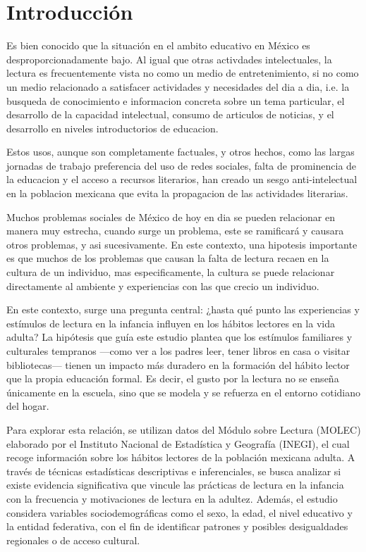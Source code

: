 \documentclass[aps,reprint]{revtex4-2}
\begin{document}
\tableofcontents

\section{Introducción}

Es bien conocido que la situación en el ambito educativo en México es desproporcionadamente bajo. Al igual que otras activdades intelectuales, la lectura es frecuentemente vista no como un medio de entretenimiento, si no como un medio relacionado a satisfacer actividades y necesidades del dia a dia, i.e. la busqueda de conocimiento e informacion concreta sobre un tema particular, el desarrollo de la capacidad intelectual, consumo de articulos de noticias, y el desarrollo en niveles introductorios de educacion. 
	
	Estos usos, aunque son completamente factuales, y otros hechos, como las largas jornadas de trabajo preferencia del uso de redes sociales, falta de prominencia de la educacion y el acceso a recursos literarios, han creado un sesgo anti-intelectual en la poblacion mexicana que evita la propagacion de las actividades literarias.

	Muchos problemas sociales de México de hoy en dia se pueden relacionar en manera muy estrecha, cuando surge un problema, este se ramificará y causara otros problemas, y asi sucesivamente. En este contexto, una hipotesis importante es que muchos de los problemas que causan la falta de lectura recaen en la cultura de un individuo, mas especificamente, la cultura se puede relacionar directamente al ambiente y experiencias con las que crecio un individuo.

  En este contexto, surge una pregunta central: ¿hasta qué punto las experiencias y estímulos de lectura en la infancia influyen en los hábitos lectores en la vida adulta? La hipótesis que guía este estudio plantea que los estímulos familiares y culturales tempranos —como ver a los padres leer, tener libros en casa o visitar bibliotecas— tienen un impacto más duradero en la formación del hábito lector que la propia educación formal. Es decir, el gusto por la lectura no se enseña únicamente en la escuela, sino que se modela y se refuerza en el entorno cotidiano del hogar.

Para explorar esta relación, se utilizan datos del Módulo sobre Lectura (MOLEC) elaborado por el Instituto Nacional de Estadística y Geografía (INEGI), el cual recoge información sobre los hábitos lectores de la población mexicana adulta. A través de técnicas estadísticas descriptivas e inferenciales, se busca analizar si existe evidencia significativa que vincule las prácticas de lectura en la infancia con la frecuencia y motivaciones de lectura en la adultez. Además, el estudio considera variables sociodemográficas como el sexo, la edad, el nivel educativo y la entidad federativa, con el fin de identificar patrones y posibles desigualdades regionales o de acceso cultural.
\end{document}
